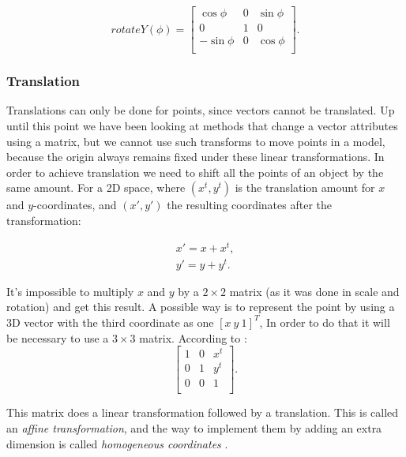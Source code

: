 \documentclass[cic,tc,english]{iiufrgs}
\begin{document}
\begin{equation}
    rotateY(\phi)=
    \begin{bmatrix}
       \cos\phi & 0 & \sin\phi \\
       0 & 1 & 0 \\
       -\sin\phi & 0 & \cos\phi \\
    \end{bmatrix}
    .
\end{equation}
\subsubsection{Translation}
\label{translationmatrixchapter}
Translations can only be done for points, since vectors cannot be translated. Up until this point we have been looking at methods that change a vector attributes using a matrix, but we cannot use such transforms to move points in a model, because the origin always remains fixed under these linear transformations. In order to achieve translation we need to shift all the points of an object by the same amount. For a 2D space, where $(x^t, y^t)$ is the translation amount for $x$ and $y$-coordinates, and $(x',y')$ the resulting coordinates after the transformation:

\begin{equation}
    \begin{array}{c}
        x' = x + x^t, \\
        y' = y + y^t.
    \end{array}
\end{equation}

It's impossible to multiply $x$ and $y$ by a $2 \times 2$ matrix (as it was done in scale and rotation) and get this result. A possible way is to represent the point by using a 3D vector with the third coordinate as one $[x\ y\ 1]^T$, In order to do that it will be necessary to use a $3 \times 3$ matrix. According to \citet{Marschner2021CGFundamentals}:
\begin{equation}
    \begin{bmatrix}
       1 & 0 & x^t \\
       0 & 1 & y^t \\
       0 & 0 & 1   \\
    \end{bmatrix}
    .
    \label{affine1}
\end{equation}

This matrix does a linear transformation followed by a translation. This is called an \textit{affine transformation}, and the way to implement them by adding an extra dimension is called \textit{homogeneous coordinates} \cite{Penna1986projectivegeometry}.
\end{document}
